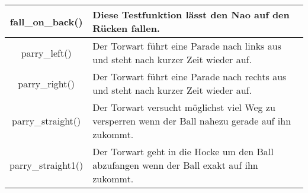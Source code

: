 \begin{tabular}{|c|p{9cm}|}
\hline 
fall\_on\_back() & Diese Testfunktion lässt den Nao auf den Rücken fallen. \\ 
\hline 
parry\_left() & Der Torwart führt eine Parade nach links aus und steht nach kurzer Zeit wieder auf. \\ 
\hline 
parry\_right() & Der Torwart führt eine Parade nach rechts aus und steht nach kurzer Zeit wieder auf. \\ 
\hline 
parry\_straight() & Der Torwart versucht möglichst viel Weg zu versperren wenn der Ball nahezu gerade auf ihn zukommt. \\ 
\hline 
parry\_straight1() & Der Torwart geht in die Hocke um den Ball abzufangen wenn der Ball exakt auf ihn zukommt. \\ 
\hline 
\end{tabular} 
